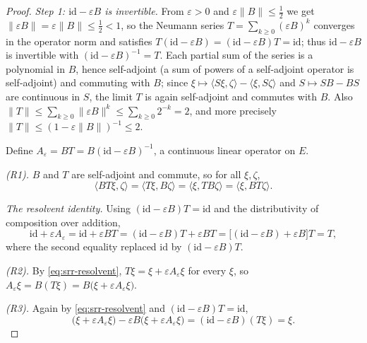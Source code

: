 \begin{proof}
\emph{Step 1: $\mathrm{id}-\varepsilon B$ is invertible.}
From $\varepsilon>0$ and $\varepsilon\|B\|\le\tfrac12$ we get
$\|\varepsilon B\|=\varepsilon\|B\|\le\tfrac12<1$, so the Neumann series
$T=\sum_{k\ge0}(\varepsilon B)^k$ converges in the operator norm and satisfies
$T(\mathrm{id}-\varepsilon B)=(\mathrm{id}-\varepsilon B)T=\mathrm{id}$; thus
$\mathrm{id}-\varepsilon B$ is invertible with
$(\mathrm{id}-\varepsilon B)^{-1}=T$. Each partial sum of the series is a
polynomial in $B$, hence self-adjoint (a sum of powers of a self-adjoint
operator is self-adjoint) and commuting with $B$; since
$\xi\mapsto\langle S\xi,\zeta\rangle-\langle\xi,S\zeta\rangle$ and
$S\mapsto SB-BS$ are continuous in $S$, the limit $T$ is again self-adjoint and
commutes with $B$. Also
$\|T\|\le\sum_{k\ge0}\|\varepsilon B\|^k\le\sum_{k\ge0}2^{-k}=2$, and more
precisely $\|T\|\le(1-\varepsilon\|B\|)^{-1}\le2$.

Define $A_\varepsilon=BT=B(\mathrm{id}-\varepsilon B)^{-1}$, a continuous linear
operator on $E$.

\emph{(R1).} $B$ and $T$ are self-adjoint and commute, so for all $\xi,\zeta$,
\[
  \langle BT\xi,\zeta\rangle=\langle T\xi,B\zeta\rangle
   =\langle\xi,TB\zeta\rangle=\langle\xi,BT\zeta\rangle .
\]

\emph{The resolvent identity.}
Using $(\mathrm{id}-\varepsilon B)T=\mathrm{id}$ and the distributivity of
composition over addition,
\begin{equation}\label{eq:srr-resolvent}
  \mathrm{id}+\varepsilon A_\varepsilon
   =\mathrm{id}+\varepsilon BT
   =(\mathrm{id}-\varepsilon B)T+\varepsilon BT
   =\bigl[(\mathrm{id}-\varepsilon B)+\varepsilon B\bigr]T
   =T,
\end{equation}
where the second equality replaced $\mathrm{id}$ by
$(\mathrm{id}-\varepsilon B)T$.

\emph{(R2).} By \eqref{eq:srr-resolvent}, $T\xi=\xi+\varepsilon A_\varepsilon\xi$
for every $\xi$, so
$A_\varepsilon\xi=B(T\xi)=B\bigl(\xi+\varepsilon A_\varepsilon\xi\bigr)$.

\emph{(R3).} Again by \eqref{eq:srr-resolvent} and
$(\mathrm{id}-\varepsilon B)T=\mathrm{id}$,
\[
  \bigl(\xi+\varepsilon A_\varepsilon\xi\bigr)
   -\varepsilon B\bigl(\xi+\varepsilon A_\varepsilon\xi\bigr)
   =(\mathrm{id}-\varepsilon B)(T\xi)=\xi .
\]


\end{proof}
